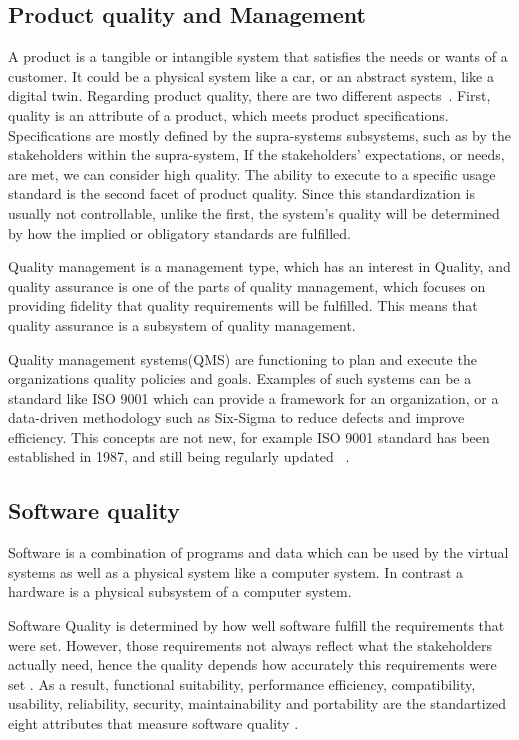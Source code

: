 \documentclass{llncs}
\begin{document}
    \subsection{Product quality and Management}
    A product is a tangible or intangible system that satisfies the needs or wants of a customer. It could be a physical system like a car, or an abstract system, like a digital twin. 
    Regarding product quality, there are two different aspects~\cite{GrievesPLMBook}.
    First, quality is an attribute of a product, which meets product specifications. Specifications are mostly defined by the supra-systems subsystems, such as by the stakeholders within the supra-system,  If the stakeholders' expectations, or needs, are met, we can consider high quality.
    The ability to execute to a specific usage standard is the second facet of product quality. Since this standardization is usually not controllable, unlike the first, the system's quality will be determined by how the implied or obligatory standards are fulfilled.

    Quality management is a management type, which has an interest in Quality, and quality assurance is one of the parts of quality management, 
    which focuses on providing fidelity that quality requirements will be fulfilled. This means that quality assurance is a subsystem of quality management.

    Quality management systems(QMS) are functioning to plan and execute the organizations quality policies and goals. 
    Examples of such systems can be a standard like ISO 9001 which can provide a framework for an organization, or a data-driven methodology such  as Six-Sigma to reduce defects and improve efficiency. 
    This concepts  are not new, for example ISO 9001 standard has been established in 1987, and still being regularly updated ~\cite{ISO9001DebunkingtheMyth}. 

    \subsection{Software quality}
    Software is a combination of programs and data which can be used by the virtual 
    systems as well as  a physical system like a computer system. In contrast a hardware 
    is a physical subsystem of a computer system\cite{OxfordDictionary}. 

    Software Quality is determined by how well software fulfill the requirements that were set. However, those requirements  
    not always reflect what the stakeholders actually need, hence the quality depends how accurately this requirements were set \cite{IEE730-2014}. 
    As a result, functional suitability, performance efficiency, compatibility, usability, reliability, security, maintainability 
    and portability are the standartized  eight attributes that measure software quality \cite{ISO/IEC:25010}.
    
\end{document}
